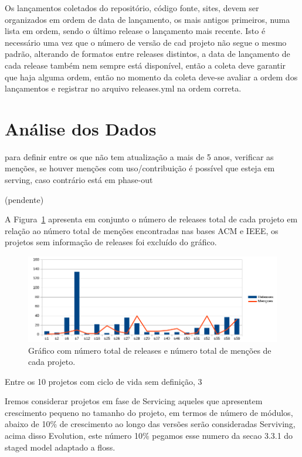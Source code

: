 Os lançamentos coletados do repositório, código fonte, sites, devem ser organizados
em ordem de data de lançamento, os mais antigos primeiros, numa lista em ordem, sendo
o último release o lançamento mais recente. Isto é necessário uma vez que o número de versão
de cad projeto não segue o mesmo padrão, alterando de formatos entre releases distintos,
a data de lançamento de cada release também nem sempre está disponível, então
a coleta deve garantir que haja alguma ordem, então no momento da coleta deve-se
avaliar a ordem dos lançamentos e registrar no arquivo releases.yml na ordem correta.

\section{Análise dos Dados} \label{estudo3:analise}

para definir entre os que não tem atualização a mais de 5 anos, verificar as
menções, se houver menções com uso/contribuição é possível que esteja em serving,
caso contrário está em phase-out

(pendente)

A Figura~\ref{releases-vs-mentions} apresenta em conjunto o número de releases total
de cada projeto em relação ao número total de menções encontradas nas bases ACM e IEEE,
os projetos sem informação de releases foi excluído do gráfico.

\begin{figure}[h]
  \centering
 \includegraphics[scale=0.6]{imagens/releases-vs-mentions.png}
  \caption{Gráfico com número total de releases e número total de menções de cada projeto.}
  \label{releases-vs-mentions}
\end{figure}


Entre os 10 projetos com ciclo de vida sem definição, 3

Iremos considerar projetos em fase de Servicing aqueles que apresentem crescimento
pequeno no tamanho do projeto, em termos de número de módulos, abaixo de 10\% de crescimento
ao longo das versões serão consideradas Serviving, acima disso Evolution, este número 10\%
pegamos esse numero da secao 3.3.1 do staged model adaptado a floss.


